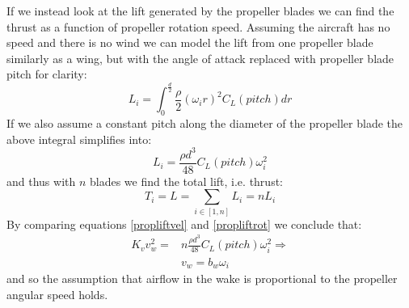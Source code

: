 If we instead look at the lift generated by the propeller blades we can find the thrust as a function of propeller rotation speed.
Assuming the aircraft has no speed and there is no wind we can model the lift from one propeller blade similarly as a wing, but with the angle of attack replaced with propeller blade pitch for clarity:
\begin{equation}
	L_i = \int_0^{\frac{d}{2}} \frac{\rho}{2} (\omega_i r)^2 C_L(pitch) dr
\end{equation}
If we also assume a constant pitch along the diameter of the propeller blade the above integral simplifies into:
\begin{equation}
	L_i = \frac{\rho d^3}{48} C_L(pitch) \omega_i^2
	\label{propliftrot}
\end{equation}
and thus with $n$ blades we find the total lift, i.e. thrust:
\begin{equation}
	T_i = L = \sum_{i \in [1,n]} L_i = n L_i
\end{equation}
By comparing equations \ref{propliftvel} and \ref{propliftrot} we conclude that:
\begin{equation} \begin{split}
	K_v v_w^2 =& n \frac{\rho d^3}{48} C_L(pitch) \omega_i^2 \Rightarrow \\
	& v_w = b_w \omega_i
\end{split}\end{equation}
and so the assumption that airflow in the wake is proportional to the propeller angular speed holds.


